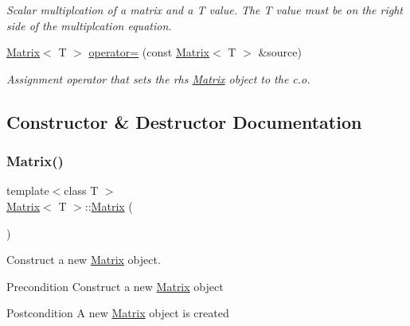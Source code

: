 \begin{DoxyCompactItemize}
\begin{DoxyCompactList}\small\item\em Scalar multiplcation of a matrix and a T value. The T value must be on the right side of the multiplcation equation. \end{DoxyCompactList}\item 
\mbox{\hyperlink{class_matrix}{Matrix}}$<$ T $>$ \mbox{\hyperlink{class_matrix_af8f0ab35b4c32f89c19f12f7e4b7d125}{operator=}} (const \mbox{\hyperlink{class_matrix}{Matrix}}$<$ T $>$ \&source)
\begin{DoxyCompactList}\small\item\em Assignment operator that sets the rhs \mbox{\hyperlink{class_matrix}{Matrix}} object to the c.\+o. \end{DoxyCompactList}\end{DoxyCompactItemize}


\subsection{Constructor \& Destructor Documentation}
\mbox{\label{class_matrix_a9d567e3a121b1be0c3f9c461cab524fe}} 
\subsubsection{\texorpdfstring{Matrix()}{Matrix()}\hspace{0.1cm}{\footnotesize\ttfamily [1/3]}}
{\footnotesize\ttfamily template$<$class T $>$ \\
\mbox{\hyperlink{class_matrix}{Matrix}}$<$ T $>$\+::\mbox{\hyperlink{class_matrix}{Matrix}} (\begin{DoxyParamCaption}{ }\end{DoxyParamCaption})}



Construct a new \mbox{\hyperlink{class_matrix}{Matrix}} object. 

\begin{DoxyPrecond}{Precondition}
Construct a new \mbox{\hyperlink{class_matrix}{Matrix}} object 
\end{DoxyPrecond}
\begin{DoxyPostcond}{Postcondition}
A new \mbox{\hyperlink{class_matrix}{Matrix}} object is created 
\end{DoxyPostcond}
\mbox{\label{class_matrix_a44eb4cf3a243fe027112d1ace474ead9}} 
